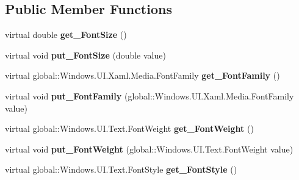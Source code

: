 \subsection*{Public Member Functions}
\begin{DoxyCompactItemize}
\item 
\mbox{\label{class_windows_1_1_u_i_1_1_xaml_1_1_controls_1_1_control_a56b25a73046ea0559a9e7cc2806702e8}} 
virtual double {\bfseries get\+\_\+\+Font\+Size} ()
\item 
\mbox{\label{class_windows_1_1_u_i_1_1_xaml_1_1_controls_1_1_control_af511651d84c62e096804d65532964059}} 
virtual void {\bfseries put\+\_\+\+Font\+Size} (double value)
\item 
\mbox{\label{class_windows_1_1_u_i_1_1_xaml_1_1_controls_1_1_control_ad993e612b853d9afcb875a5e4234fcc1}} 
virtual global\+::\+Windows.\+U\+I.\+Xaml.\+Media.\+Font\+Family {\bfseries get\+\_\+\+Font\+Family} ()
\item 
\mbox{\label{class_windows_1_1_u_i_1_1_xaml_1_1_controls_1_1_control_af2d5ee1323dfd2ae954b480a76f90bba}} 
virtual void {\bfseries put\+\_\+\+Font\+Family} (global\+::\+Windows.\+U\+I.\+Xaml.\+Media.\+Font\+Family value)
\item 
\mbox{\label{class_windows_1_1_u_i_1_1_xaml_1_1_controls_1_1_control_a7ebe7963613a80ab54042ed42d0fa16d}} 
virtual global\+::\+Windows.\+U\+I.\+Text.\+Font\+Weight {\bfseries get\+\_\+\+Font\+Weight} ()
\item 
\mbox{\label{class_windows_1_1_u_i_1_1_xaml_1_1_controls_1_1_control_acf14fc60ff1e6b2aacf2503e680ebc89}} 
virtual void {\bfseries put\+\_\+\+Font\+Weight} (global\+::\+Windows.\+U\+I.\+Text.\+Font\+Weight value)
\item 
\mbox{\label{class_windows_1_1_u_i_1_1_xaml_1_1_controls_1_1_control_a3083dad6568d1d20caa957d9a785e415}} 
virtual global\+::\+Windows.\+U\+I.\+Text.\+Font\+Style {\bfseries get\+\_\+\+Font\+Style} ()

\end{DoxyCompactItemize}

